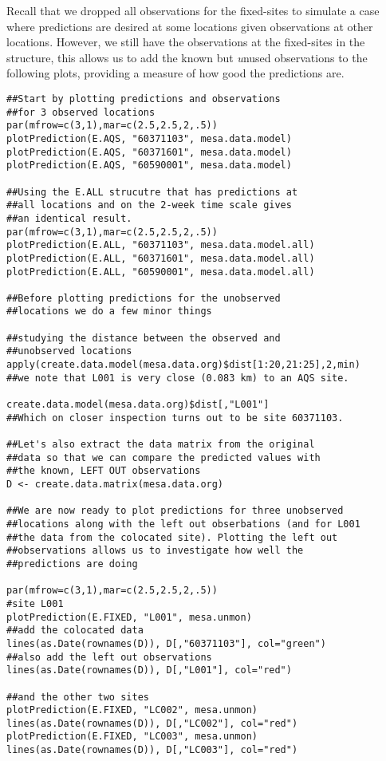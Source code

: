 Recall that we dropped all observations for the {\sc fixed}-sites to simulate 
a case where predictions are desired at some locations given observations 
at other locations. However, we still have the observations at the 
{\sc fixed}-sites in the  structure, this allows us to add 
the known but {\emph unused} observations to the following plots, 
providing a measure of how good the predictions are.
\vspace*{-0.5\baselineskip}
\begin{verbatim}
##Start by plotting predictions and observations 
##for 3 observed locations
par(mfrow=c(3,1),mar=c(2.5,2.5,2,.5))
plotPrediction(E.AQS, "60371103", mesa.data.model)
plotPrediction(E.AQS, "60371601", mesa.data.model)
plotPrediction(E.AQS, "60590001", mesa.data.model)

##Using the E.ALL strucutre that has predictions at 
##all locations and on the 2-week time scale gives 
##an identical result.
par(mfrow=c(3,1),mar=c(2.5,2.5,2,.5))
plotPrediction(E.ALL, "60371103", mesa.data.model.all)
plotPrediction(E.ALL, "60371601", mesa.data.model.all)
plotPrediction(E.ALL, "60590001", mesa.data.model.all)

##Before plotting predictions for the unobserved 
##locations we do a few minor things

##studying the distance between the observed and 
##unobserved locations
apply(create.data.model(mesa.data.org)$dist[1:20,21:25],2,min)
##we note that L001 is very close (0.083 km) to an AQS site.

create.data.model(mesa.data.org)$dist[,"L001"]
##Which on closer inspection turns out to be site 60371103.

##Let's also extract the data matrix from the original 
##data so that we can compare the predicted values with 
##the known, LEFT OUT observations
D <- create.data.matrix(mesa.data.org)

##We are now ready to plot predictions for three unobserved 
##locations along with the left out obserbations (and for L001 
##the data from the colocated site). Plotting the left out 
##observations allows us to investigate how well the
##predictions are doing

par(mfrow=c(3,1),mar=c(2.5,2.5,2,.5))
#site L001
plotPrediction(E.FIXED, "L001", mesa.unmon)
##add the colocated data
lines(as.Date(rownames(D)), D[,"60371103"], col="green")
##also add the left out observations
lines(as.Date(rownames(D)), D[,"L001"], col="red")

##and the other two sites
plotPrediction(E.FIXED, "LC002", mesa.unmon)
lines(as.Date(rownames(D)), D[,"LC002"], col="red")
plotPrediction(E.FIXED, "LC003", mesa.unmon)
lines(as.Date(rownames(D)), D[,"LC003"], col="red")


\end{verbatim}
